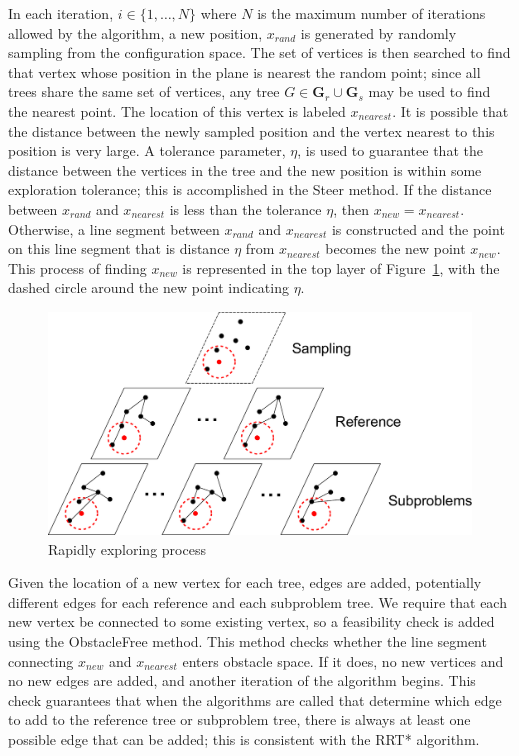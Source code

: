 \documentclass[conference]{IEEEtran}
\begin{document}
In each iteration, $i\in\{1, \ldots, N\}$ where $N$ is the maximum number of iterations allowed by the algorithm, a new position, $x_{rand}$ is generated by randomly sampling from the configuration space.  
The set of vertices is then searched to find that vertex whose position in the plane is nearest the random point; since all trees share the same set of vertices, any tree $G\in{\mathbf G}_r \cup {\mathbf G}_s$ may be used to find the nearest point.  
The location of this vertex is labeled $x_{nearest}$.  
It is possible that the distance between the newly sampled position and the vertex nearest to this position is very large.  
A tolerance parameter, $\eta$, is used to guarantee that the distance between the vertices in the tree and the new position is within some exploration tolerance; this is accomplished in the {\sc Steer} method.  
If the distance between $x_{rand}$ and $x_{nearest}$ is less than the tolerance $\eta$, then $x_{new}=x_{nearest}$.  
Otherwise, a line segment between $x_{rand}$ and $x_{nearest}$ is constructed and the point on this line segment that is distance $\eta$ from $x_{nearest}$ becomes the new point $x_{new}$. 
This process of finding $x_{new}$ is represented in the top layer of Figure~\ref{fig:MORRTstar}, with the dashed circle around the new point indicating $\eta$.

\begin{figure}[H]
\centering
\includegraphics[width=0.9\linewidth]{./fig/MORRTstar}
\caption{Rapidly exploring process}
\label{fig:MORRTstar}
\end{figure}

Given the location of a new vertex for each tree, edges are added, potentially different edges for each reference and each subproblem tree.
We require that each new vertex be connected to some existing vertex, so a feasibility check is added using the {\sc ObstacleFree} method.
This method checks whether the line segment connecting $x_{new}$ and $x_{nearest}$ enters obstacle space.
If it does, no new vertices and no new edges are added, and another iteration of the algorithm begins. 
This check guarantees that when the algorithms are called that determine which edge to add to the reference tree or subproblem tree, there is always at least one possible edge that can be added; this is consistent with the RRT* algorithm.
\end{document}
